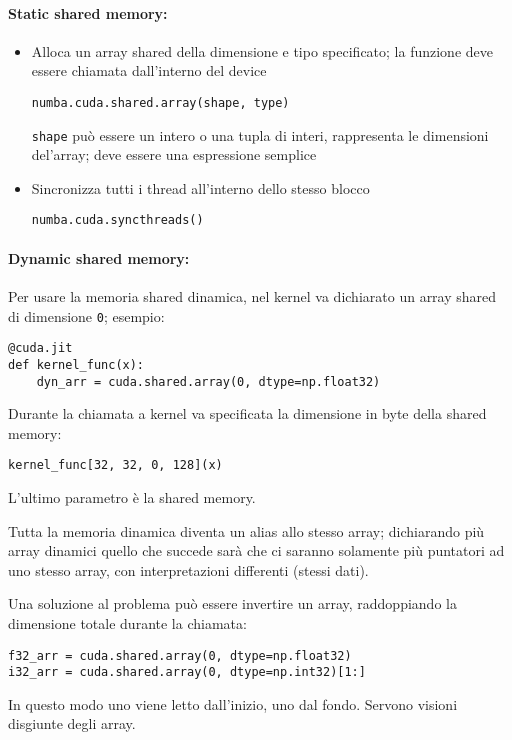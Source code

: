 \paragraph{Static shared memory:}
\begin{itemize}
	\item Alloca un array shared della dimensione e tipo specificato; la funzione deve essere chiamata dall'interno del device
	\begin{verbatim}
numba.cuda.shared.array(shape, type)
	\end{verbatim}
	\texttt{shape} può essere un intero o una tupla di interi, rappresenta le dimensioni del'array; deve essere una espressione semplice
	
	\item Sincronizza tutti i thread all'interno dello stesso blocco
	\begin{verbatim}
numba.cuda.syncthreads()
	\end{verbatim}
\end{itemize} 

\paragraph{Dynamic shared memory:} Per usare la memoria shared dinamica, nel kernel va dichiarato un array shared di dimensione \texttt{0}; esempio:
\begin{verbatim}
@cuda.jit
def kernel_func(x):
    dyn_arr = cuda.shared.array(0, dtype=np.float32)
\end{verbatim}

Durante la chiamata a kernel va specificata la dimensione in byte della shared memory:
\begin{verbatim}
kernel_func[32, 32, 0, 128](x)
\end{verbatim}
L'ultimo parametro è la shared memory.

Tutta la memoria dinamica diventa un alias allo stesso array; dichiarando più array dinamici quello che succede sarà che ci saranno solamente più puntatori ad uno stesso array, con interpretazioni differenti (stessi dati).

Una soluzione al problema può essere invertire un array, raddoppiando la dimensione totale durante la chiamata:
\begin{verbatim}
f32_arr = cuda.shared.array(0, dtype=np.float32)
i32_arr = cuda.shared.array(0, dtype=np.int32)[1:]
\end{verbatim}

In questo modo uno viene letto dall'inizio, uno dal fondo. Servono visioni disgiunte degli array.

